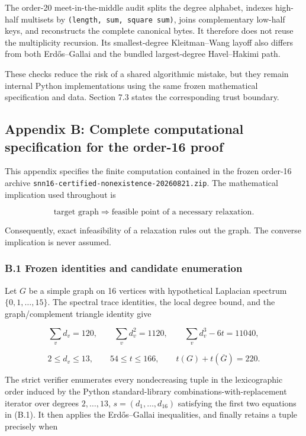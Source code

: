 \documentclass[
  english,
  11pt,
  a4paper,
]{article}
\newcounter{none} %
\begin{document}
The order-20 meet-in-the-middle audit splits the degree alphabet,
indexes high-half multisets by \texttt{(length,\ sum,\ square\ sum)},
joins complementary low-half keys, and reconstructs the complete
canonical bytes. It therefore does not reuse the multiplicity recursion.
Its smallest-degree Kleitman--Wang layoff also differs from both
Erdős--Gallai and the bundled largest-degree Havel--Hakimi path.

These checks reduce the risk of a shared algorithmic mistake, but they
remain internal Python implementations using the same frozen
mathematical specification and data. Section 7.3 states the
corresponding trust boundary.

\subsection{Appendix B: Complete computational specification for the
order-16
proof}\label{appendix-b-complete-computational-specification-for-the-order-16-proof}

This appendix specifies the finite computation contained in the frozen
order-16 archive \texttt{snn16-certified-nonexistence-20260821.zip}. The
mathematical implication used throughout is

\[
\text{target graph}
\Longrightarrow
\text{feasible point of a necessary relaxation}.
\]

Consequently, exact infeasibility of a relaxation rules out the graph.
The converse implication is never assumed.

\subsubsection{B.1 Frozen identities and candidate
enumeration}\label{b.1-frozen-identities-and-candidate-enumeration}

Let \(G\) be a simple graph on 16 vertices with hypothetical Laplacian
spectrum \(\{0,1,\ldots,15\}\). The spectral trace identities, the local
degree bound, and the graph/complement triangle identity give

\[
\sum_v d_v=120,\qquad
\sum_v d_v^2=1120,\qquad
\sum_v d_v^3-6t=11040,
\tag{B.1}
\]

\[
2\le d_v\le13,\qquad
54\le t\le166,\qquad
t(G)+t(\overline G)=220.
\tag{B.2}
\]

The strict verifier enumerates every nondecreasing tuple in the
lexicographic order induced by the Python standard-library
combinations-with-replacement iterator over degrees \(2,\ldots,13\),
\(s=(d_1,\ldots,d_{16})\) satisfying the first two equations in (B.1).
It then applies the Erdős--Gallai inequalities, and finally retains a
tuple precisely when
\end{document}
